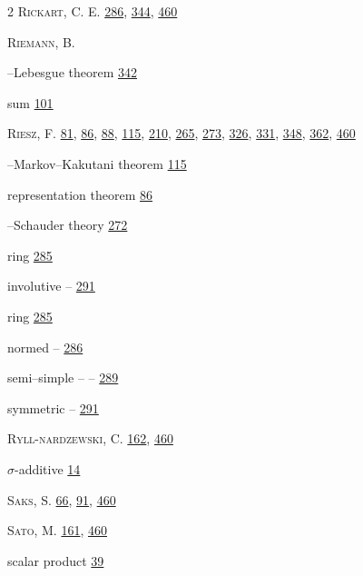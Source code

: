 \begin{multicols}{2}
\noindent \textsc{Rickart}, C. E. \hyperlink{page.286}{286}, \hyperlink{page.344}{344}, \hyperlink{page.460}{460}\par
\noindent \textsc{Riemann}, B.\par
\hspace*{1.1em}--Lebesgue theorem \hyperlink{page.342}{342}\par
\hspace*{1.1em}sum \hyperlink{page.101}{101}\par
\noindent \textsc{Riesz}, F. \hyperlink{page.81}{81}, \hyperlink{page.86}{86}, \hyperlink{page.88}{88}, \hyperlink{page.115}{115}, \hyperlink{page.210}{210}, \hyperlink{page.265}{265}, \hyperlink{page.273}{273}, \hyperlink{page.326}{326}, \hyperlink{page.331}{331}, \hyperlink{page.348}{348}, \hyperlink{page.362}{362}, \hyperlink{page.460}{460}\par
\hspace*{1.1em}--Markov--Kakutani theorem \hyperlink{page.115}{115}\par
\hspace*{1.1em}representation theorem \hyperlink{page.86}{86}\par
\hspace*{1.1em}--Schauder theory \hyperlink{page.272}{272}\par
\noindent ring \hyperlink{page.285}{285}\par
\hspace*{1.1em}involutive -- \hyperlink{page.291}{291}\par
\noindent ring \hyperlink{page.285}{285}\par
\hspace*{1.1em}normed -- \hyperlink{page.286}{286}\par
\hspace*{2.2em}semi--simple -- -- \hyperlink{page.289}{289}\par
\hspace*{1.1em}symmetric -- \hyperlink{page.291}{291}\par
\noindent \textsc{Ryll-nardzewski}, C. \hyperlink{page.162}{162}, \hyperlink{page.460}{460}\par
\noindent $\sigma $-additive \hyperlink{page.14}{14}\par
\noindent \textsc{Saks}, S. \hyperlink{page.66}{66}, \hyperlink{page.91}{91}, \hyperlink{page.460}{460}\par
\noindent \textsc{Sato}, M. \hyperlink{page.161}{161}, \hyperlink{page.460}{460}\par
\noindent scalar product \hyperlink{page.39}{39}\par

\end{multicols}
